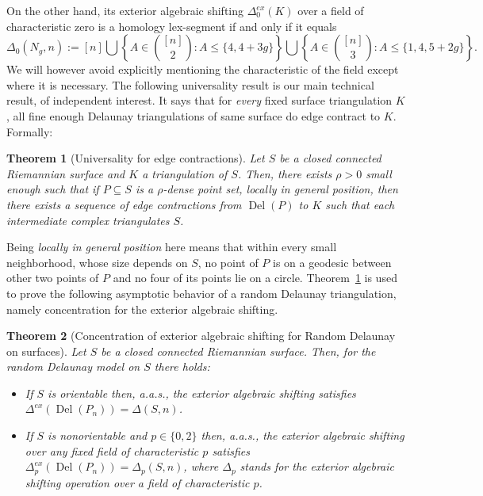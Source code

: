 \documentclass[11pt]{article}
\newtheorem{theorem}{Theorem}
\numberwithin{claimcounter}{theorem}
\theoremstyle{remark}
\theoremstyle{definition}
\numberwithin{theorem}{section}
\DeclareMathOperator{\Del}{Del}
\begin{document}
On the other hand, its exterior algebraic shifting 
$\Delta_0^{ex}(K)$ over a field of characteristic zero
is a homology lex-segment if and only if it equals
$$\Delta_0(N_g, n):= [n] \bigcup \left \{A\in \binom{[n]}{2}\colon A \leq \{4,4+3g\} \right \} \bigcup \left \{ A\in \binom{[n]}{3} \colon A \leq \{1,4,5+2g\} \right \}.$$
We will however avoid explicitly mentioning the characteristic of the field except where it is necessary.
%
The following universality result is our main technical result, of independent interest. It says that for \emph{every} fixed surface triangulation $K$, all fine enough Delaunay triangulations of same surface do edge contract to $K$. Formally:

\begin{theorem}[Universality for edge contractions]
    \label{t:delaunayref}
    Let $S$ be a closed connected Riemannian surface and $K$ a triangulation of $S$. Then, there exists $\rho>0$ small enough such that if $P\subseteq S$ is a $\rho$-dense point set, locally in general position, then there exists a sequence of edge contractions from $\Del(P)$ to $K$ such that each intermediate complex triangulates $S$.
\end{theorem}

Being \emph{locally in general position} here means that within every small neighborhood, whose size depends on $S$, no point of $P$ is on a geodesic between other two points of $P$ and no four of its points lie on a circle.
Theorem~\ref{t:delaunayref} is used to prove the following asymptotic behavior of a random Delaunay triangulation, namely concentration for the exterior algebraic shifting.

\begin{theorem}[Concentration of exterior algebraic shifting for Random Delaunay on surfaces]\label{t:aasDelauney}
Let $S$ be a closed connected Riemannian surface. Then, for the random Delaunay model on $S$ there holds:
\begin{itemize}
    \item If $S$ is orientable then, a.a.s., the exterior algebraic shifting satisfies
$\Delta^{ex}(\Del(P_n))
    =\Delta(S,n)
    $.
    \item If $S$ is nonorientable and $p\in \{0,2\}$ then, a.a.s., 
the exterior algebraic shifting over any fixed field of characteristic $p$ satisfies $\Delta^{ex}_p(\Del(P_n)) 
    =\Delta_p(S,n)$,
    where $\Delta_p$ stands for the exterior algebraic shifting operation over a field of characteristic $p$.
\end{itemize}
%
%
\end{theorem}
\end{document}
